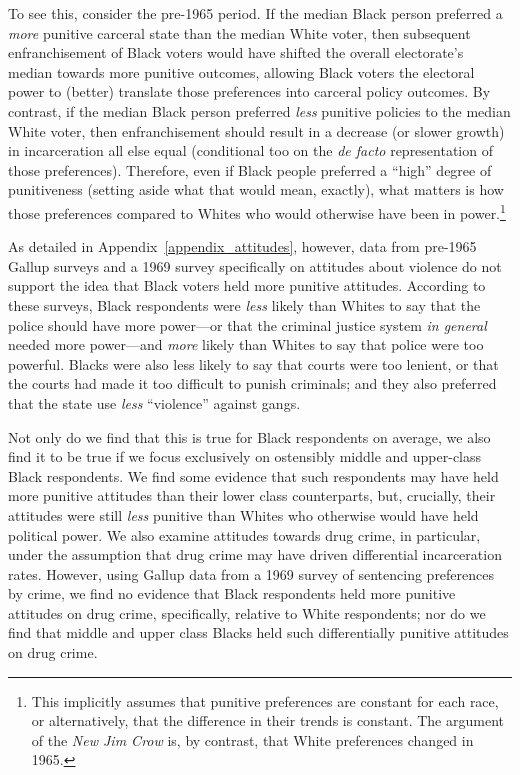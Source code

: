 \documentclass[12pt]{article}
\begin{document}
To see this, consider the pre-1965 period. If the median Black person preferred a \emph{more} punitive carceral state than the median White voter, then subsequent enfranchisement of Black voters would have shifted the overall electorate's median towards more punitive outcomes, allowing Black voters the electoral power to (better) translate those preferences into carceral policy outcomes.  By contrast, if the median Black person preferred \emph{less} punitive policies to the median White voter, then enfranchisement should result in a decrease (or slower growth) in incarceration all else equal (conditional too on the \emph{de facto} representation of those preferences). Therefore, even if Black people preferred a ``high'' degree of punitiveness (setting aside what that would mean, exactly), what matters is how those preferences compared to Whites who would otherwise have been in power.\footnote{This implicitly assumes that punitive preferences are constant for each race, or alternatively, that the difference in their trends is constant. The argument of the \emph{New Jim Crow} is, by contrast, that White preferences changed in 1965.}

As detailed in Appendix~\ref{appendix_attitudes}, however, data from pre-1965 Gallup surveys and a 1969 survey specifically on attitudes about violence \citep{Violence1969} do not support the idea that Black voters held more punitive attitudes. According to these surveys, Black respondents were \emph{less} likely than Whites to say that the police should have more power---or that the criminal justice system \emph{in general} needed more power---and \emph{more} likely than Whites to say that police were too powerful.  Blacks were also less likely to say that courts were too lenient, or that the courts had made it too difficult to punish criminals; and they also preferred that the state use \emph{less} ``violence'' against gangs.

Not only do we find that this is true for Black respondents on average, we also find it to be true if we focus exclusively on ostensibly middle and upper-class Black respondents.  We find some evidence that such respondents may have held more punitive attitudes than their lower class counterparts, but, crucially, their attitudes were still \emph{less} punitive than Whites who otherwise would have held political power.  We also examine attitudes towards drug crime, in particular, under the assumption that drug crime may have driven differential incarceration rates.  However, using Gallup data from a 1969 survey of sentencing preferences by crime, we find no evidence that Black respondents held more punitive attitudes on drug crime, specifically, relative to White respondents; nor do we find that middle and upper class Blacks held such differentially punitive attitudes on drug crime.
\end{document}
